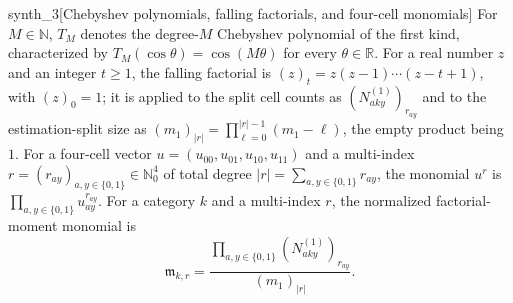 \begin{definitionv}{synth_3}[Chebyshev polynomials, falling factorials, and four-cell monomials]
For \(M\in\mathbb N\), \(T_M\) denotes the degree-\(M\) Chebyshev polynomial of the first kind, characterized by \(T_M(\cos\theta)=\cos(M\theta)\) for every \(\theta\in\mathbb R\). For a real number \(z\) and an integer \(t\ge1\), the falling factorial is \((z)_t=z(z-1)\cdots(z-t+1)\), with \((z)_0=1\); it is applied to the split cell counts as \((N^{(1)}_{aky})_{r_{ay}}\) and to the estimation-split size as \((m_1)_{|r|}=\prod_{\ell=0}^{|r|-1}(m_1-\ell)\), the empty product being \(1\). For a four-cell vector \(u=(u_{00},u_{01},u_{10},u_{11})\) and a multi-index \(r=(r_{ay})_{a,y\in\{0,1\}}\in\mathbb N_0^4\) of total degree \(|r|=\sum_{a,y\in\{0,1\}}r_{ay}\), the monomial \(u^r\) is \(\prod_{a,y\in\{0,1\}}u_{ay}^{r_{ay}}\). For a category \(k\) and a multi-index \(r\), the normalized factorial-moment monomial is \[ \mathfrak m_{k,r} = \frac{\prod_{a,y\in\{0,1\}}(N^{(1)}_{aky})_{r_{ay}}}{(m_1)_{|r|}}. \]
\end{definitionv}

